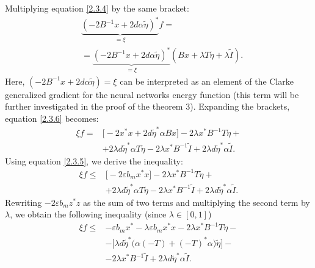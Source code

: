 \documentclass[journal]{IEEEtran}
\theoremstyle{myplain}
\begin{document}
\begin{IEEEproof}
Multiplying equation \eqref{2.3.4} by the same bracket:
\begin{equation}\label{2.3.6}
\begin{aligned}&
\underbrace{(-2B^{-1}x+2d \alpha\widetilde\eta)^{*}}_{=\xi} f  =\\&= \underbrace{(-2B^{-1}x+2d \alpha\widetilde\eta)^{*}}_{=\xi}(Bx + \lambda T \widetilde{\eta} + \lambda \widetilde I ).    
\end{aligned}
\end{equation}
Here, $(-2B^{-1}x+2d\alpha\widetilde{\eta}) = \xi$ can be interpreted as an element of the Clarke generalized gradient \cite{p14} for the neural networks energy function (this term will be further investigated in the proof of the theorem 3). Expanding the brackets, equation \eqref{2.3.6} becomes:
\begin{equation*}\label{2.3.7} 
\begin{aligned}\xi f  = & \big[-2 x^{*} x + 2 d \widetilde{\eta}^{*}  \alpha Bx\big] - 2 \lambda x^{*} B^{-1} T \widetilde{\eta} +\\ & +2 \lambda d  \widetilde{\eta}^{*} \alpha T \widetilde{\eta} - 2 \lambda x^{*} B^{-1} \widetilde I + 2\lambda d \widetilde\eta^{*} \alpha \widetilde I .\end{aligned}   
\end{equation*}
Using equation \eqref{2.3.5}, we derive the inequality:
\begin{equation*}\label{2.3.8} 
\begin{aligned} \xi f  \leqslant & \big[-2 \varepsilon b_m x^{*} x \big]- 2 \lambda x^{*} B^{-1} T \widetilde{\eta} +\\ & +2 \lambda d  \widetilde{\eta}^{*} \alpha T \widetilde{\eta} - 2 \lambda x^{*} B^{-1} \widetilde I + 2\lambda d \widetilde\eta^{*} \alpha \widetilde I.
\end{aligned}      
\end{equation*} 
Rewriting $-2\varepsilon b_m z^{*}z$ as the sum of two terms and multiplying the second term by $\lambda$, we obtain the following inequality (since $\lambda \in [0,1]$)
\begin{equation}\label{2.3.9}
\begin{aligned}\xi f \leqslant & - \varepsilon b_m x^{*} - \lambda \varepsilon b_m x^{*} x - 2 \lambda x^{*} B^{-1} T \widetilde{\eta} -\\ & -\big[ \lambda d \widetilde\eta^{*}\big (\alpha(-T) +(-T)^{*}\alpha\big)\widetilde\eta\big]- \\ &-2 \lambda x^{*} B^{-1} \widetilde I + 2\lambda d \widetilde\eta^{*} \alpha \widetilde I.

\end{aligned}
\end{equation}
\end{IEEEproof}
\end{document}
